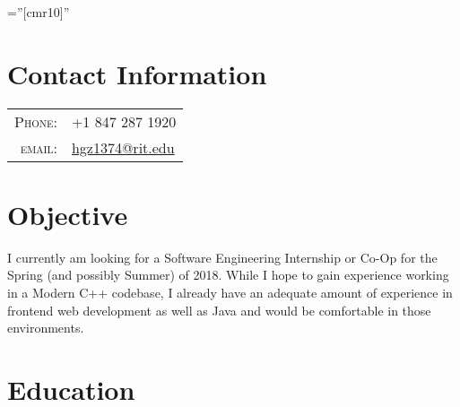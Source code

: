 \documentclass[a4paper,10pt]{article} %
\begin{document}
\pagestyle{empty} %

\font\fb=''[cmr10]'' %


\par{\bigskip\par} %

\section{Contact Information}

\begin{tabular}{rl}
\textsc{Phone:} & +1 847 287 1920\\
\textsc{email:} & \href{mailto:hgz1374@rit.edu}{hgz1374@rit.edu}
\end{tabular}

\section{Objective}
\small{
    I currently am looking for a Software Engineering Internship or Co-Op for the Spring (and possibly Summer) of 2018.
    While I hope to gain experience working in a Modern C++ codebase, I already have an adequate amount of experience in frontend web development as well as Java and would be comfortable in those environments.
}


\section{Education}
\end{document}
